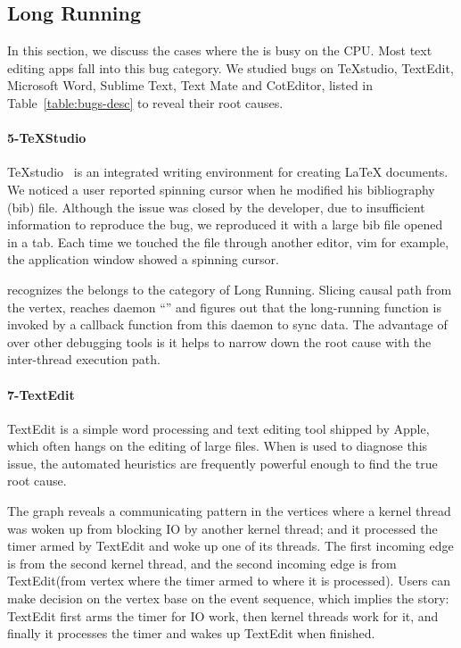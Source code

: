 \subsection{Long Running}

In this section, we discuss the cases where the \spinningnode is busy on the
CPU. Most text editing apps fall into this bug category. We studied bugs on
TeXstudio, TextEdit, Microsoft Word, Sublime Text, Text Mate and CotEditor,
listed in Table~\ref{table:bugs-desc} to reveal their root causes.


\paragraph{5-TeXStudio}

TeXstudio~\cite{TeXStudio} is an integrated writing environment for creating
LaTeX documents. We noticed a user reported spinning cursor when he modified
his bibliography (bib) file. Although the issue was closed by the developer,
due to insufficient information to reproduce the bug, we reproduced it with a
large bib file opened in a tab. Each time we touched the file through another
editor, vim for example, the application window showed a spinning cursor.

\xxx recognizes the \spinningnode belongs to the category of Long Running.
Slicing causal path from the vertex, \xxx reaches daemon ``'' and
figures out that the long-running function is invoked by a callback function
from this daemon to sync data. The advantage of \xxx over other debugging tools
is it helps to narrow down the root cause with the inter-thread execution path.

\paragraph{7-TextEdit}

TextEdit is a simple word processing and text editing tool shipped by Apple,
which often hangs on the editing of large files.  When \xxx is used to diagnose
this issue, the automated heuristics are frequently powerful enough to find the
true root cause.

The graph reveals a communicating pattern in the vertices where a kernel thread
was woken up from blocking IO by another kernel thread; and it processed the
timer armed by TextEdit and woke up one of its threads. The first incoming edge
is from the second kernel thread, and the second incoming edge is from
TextEdit(from vertex where the timer armed to where it is processed). Users can
make decision on the vertex base on the event sequence, which implies the
story: TextEdit first arms the timer for IO work, then kernel threads work for
it, and finally it processes the timer and wakes up TextEdit when finished.

